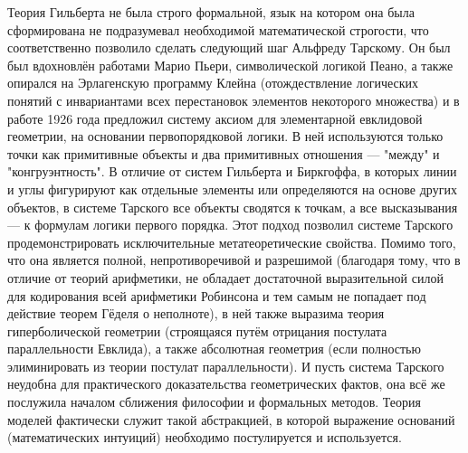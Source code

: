 \documentclass[14pt]{extarticle}
\begin{document}
	Теория Гильберта не была строго формальной, язык на котором она была сформирована не подразумевал необходимой математической строгости, что соответственно позволило сделать следующий шаг Альфреду Тарскому. Он был был вдохновлён работами Марио Пьери, символической логикой Пеано, а также опирался на Эрлагенскую программу Клейна (отождествление логических понятий с инвариантами всех перестановок элементов некоторого множества) и в работе 1926 года предложил систему аксиом для элементарной евклидовой геометрии, на основании первопорядковой логики. В ней используются только точки как примитивные объекты и два примитивных отношения — "между" и "конгруэнтность". В отличие от систем Гильберта и Биркгоффа, в которых линии и углы фигурируют как отдельные элементы или определяются на основе других объектов, в системе Тарского все объекты сводятся к точкам, а все высказывания — к формулам логики первого порядка. Этот подход позволил системе Тарского продемонстрировать исключительные метатеоретические свойства. Помимо того, что она является полной, непротиворечивой и разрешимой (благодаря тому, что в отличие от теорий арифметики, не обладает достаточной выразительной силой для кодирования всей арифметики Робинсона и тем самым не попадает под действие теорем Гёделя о неполноте), в ней также выразима теория гиперболической геометрии (строящаяся путём отрицания постулата параллельности Евклида), а также абсолютная геометрия (если полностью элиминировать из теории постулат параллельности).
	И пусть система Тарского неудобна для практического доказательства геометрических фактов, она всё же послужила началом сближения философии и формальных методов. Теория моделей фактически служит такой абстракцией, в которой выражение оснований (математических интуиций) необходимо постулируется и используется.
	
\end{document}
